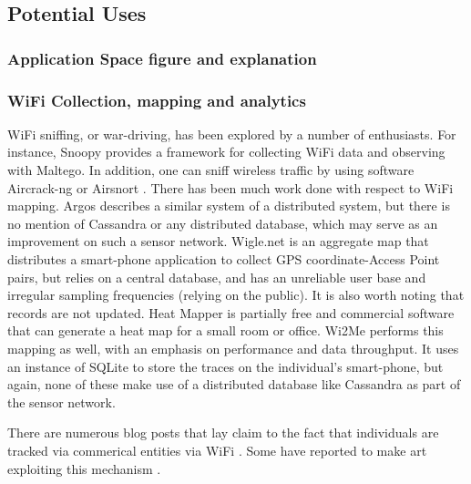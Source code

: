 


\subsection{Potential Uses}
\subsubsection{Application Space figure and explanation}
\subsubsection{WiFi Collection, mapping and analytics}
WiFi sniffing, or war-driving, has been explored by a number of enthusiasts.
For instance, Snoopy \cite{SensePostFramework} provides a framework for collecting WiFi data and observing with Maltego.
In addition, one can sniff wireless traffic by using software Aircrack-ng \cite{Aircrack-ng} or Airsnort \cite{AirSnortHomepage}.
There has been much work done with respect to WiFi mapping.  Argos \cite{Rose2010MappingArgos} describes a similar system of a distributed system, but there is no mention of Cassandra or any distributed database, which may serve as an improvement on such a sensor network.  Wigle.net \cite{WiGLE:Mapping} is an aggregate map that distributes a smart-phone application to collect GPS coordinate-Access Point pairs, but relies on a central database, and has an unreliable user base and irregular sampling frequencies (relying on the public).  It is also worth noting that records are not updated.  Heat Mapper \cite{HeatMapperOffices} is partially free and commercial software that can generate a heat map for a small room or office.  Wi2Me \cite{Castignani2012Wi2Me:Networks} performs this mapping as well, with an emphasis on performance and data throughput.  It uses an instance of SQLite to store the traces on the individual's smart-phone, but again, none of these make use of a distributed database like Cassandra as part of the sensor network.

There are numerous blog posts that lay claim to the fact that individuals are tracked via commerical entities via WiFi \cite{HaighTrackingConnected}. Some have reported to make art exploiting this mechanism \cite{KeebleCasual2013}.


